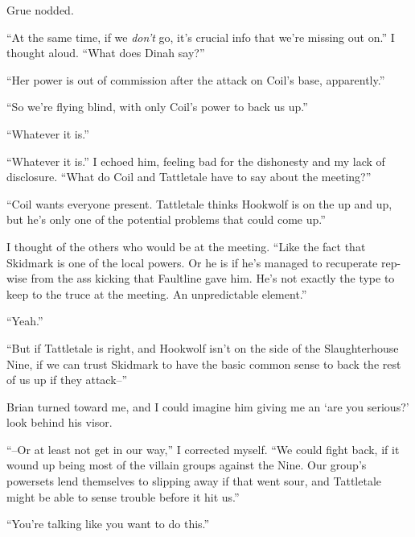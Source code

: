 Grue nodded.



``At the same time, if we \emph{don't} go, it's crucial info that we're missing out on.'' I thought aloud.  ``What does Dinah say?''



``Her power is out of commission after the attack on Coil's base, apparently.''



``So we're flying blind, with only Coil's power to back us up.''



``Whatever it is.''



``Whatever it is.'' I echoed him, feeling bad for the dishonesty and my lack of disclosure. ``What do Coil and Tattletale have to say about the meeting?''



``Coil wants everyone present.  Tattletale thinks Hookwolf is on the up and up, but he's only one of the potential problems that could come up.''



I thought of the others who would be at the meeting.  ``Like the fact that Skidmark is one of the local powers.  Or he is if he's managed to recuperate rep-wise from the ass kicking that Faultline gave him.  He's not exactly the type to keep to the truce at the meeting.  An unpredictable element.''



``Yeah.''



``But if Tattletale is right, and Hookwolf isn't on the side of the Slaughterhouse Nine, if we can trust Skidmark to have the basic common sense to back the rest of us up if they attack--''



Brian turned toward me, and I could imagine him giving me an `are you serious?' look behind his visor.



``--Or at least not get in our way,'' I corrected myself.  ``We could fight back, if it wound up being most of the villain groups against the Nine.  Our group's powersets lend themselves to slipping away if that went sour, and Tattletale might be able to sense trouble before it hit us.''



``You're talking like you want to do this.''



